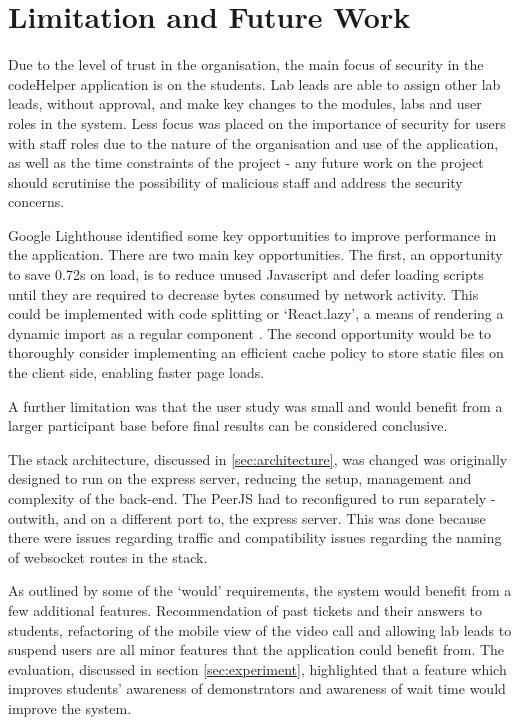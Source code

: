\section{Limitation and Future Work}\label{sec:futurework}

Due to the level of trust in the organisation, the main focus of security in the codeHelper application is on the students. Lab leads are able to assign other lab leads, without approval, and make key changes to the modules, labs and user roles in the system. Less focus was placed on the importance of security for users with staff roles due to the nature of the organisation and use of the application, as well as the time constraints of the project - any future work on the project should scrutinise the possibility of malicious staff and address the security concerns.

Google Lighthouse \cite{Lighthouse} identified some key opportunities to improve performance in the application. There are two main key opportunities. The first, an opportunity to save 0.72s on load, is to reduce unused Javascript and defer loading scripts until they are required to decrease bytes consumed by network activity. This could be implemented with code splitting or `React.lazy', a means of rendering a dynamic import as a regular component \cite{codesplit}. The second opportunity would be to thoroughly consider implementing an efficient cache policy to store static files on the client side, enabling faster page loads.

A further limitation was that the user study was small and would benefit from a larger participant base before final results can be considered conclusive.

The stack architecture, discussed in \ref{sec:architecture}, was changed was originally designed to run on the express server, reducing the setup, management and complexity of the back-end. The PeerJS had to reconfigured to run separately - outwith, and on a different port to, the express server. This was done because there were issues regarding traffic and compatibility issues regarding the naming of websocket routes in the stack. 

As outlined by some of the `would' requirements, the system would benefit from a few additional features. Recommendation of past tickets and their answers to students, refactoring of the mobile view of the video call and allowing lab leads to suspend users are all minor features that the application could benefit from. The evaluation, discussed in section \ref{sec:experiment}, highlighted that a feature which improves students' awareness of demonstrators and awareness of wait time would improve the system.



